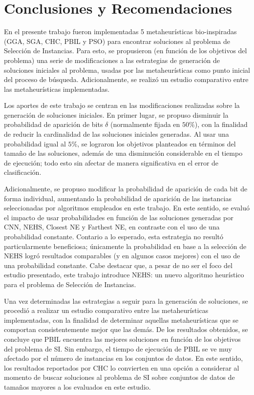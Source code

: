 \chapter*{Conclusiones y Recomendaciones}
\label{conclusiones}

En el presente trabajo fueron implementadas 5 metaheurísticas bio-inspiradas (GGA, SGA, CHC, PBIL y PSO) para encontrar soluciones al problema de Selección de Instancias. Para esto, se propusieron (en función de los objetivos del problema) una serie de modificaciones a las estrategias de generación de soluciones iniciales al problema, usadas por las metaheurísticas como punto inicial del proceso de búsqueda. Adicionalmente, se realizó un estudio comparativo entre las metaheurísticas implementadas.%

Los aportes de este trabajo se centran en las modificaciones realizadas sobre la generación de soluciones iniciales. En primer lugar, se propuso disminuir la probabilidad de aparición de bits $\delta$ (normalmente fijada en $50\%$), con la finalidad de reducir la cardinalidad de las soluciones iniciales generadas. Al usar una probabilidad igual al $5\%$, se lograron los objetivos planteados en términos del tamaño de las soluciones, además de una disminución considerable en el tiempo de ejecución; todo esto sin afectar de manera significativa en el error de clasificación.

Adicionalmente, se propuso modificar la probabilidad de aparición de cada bit de forma individual, aumentando la probabilidad de aparición de las instancias seleccionadas por algoritmos empleados en este trabajo. En este sentido, se evaluó el impacto de usar probabilidades en función de las soluciones generadas por CNN, NEHS, Closest NE y Farthest NE, en contraste con el uso de una probabilidad constante. Contario a lo esperado, esta estrategia no resultó particularmente beneficiosa; únicamente la probabilidad en base a la selección de NEHS logró resultados comparables (y en algunos casos mejores) con el uso de una probabilidad constante. Cabe destacar que, a pesar de no ser el foco del estudio presentado, este trabajo introduce NEHS: un nuevo algoritmo heurístico para el problema de Selección de Instancias.

Una vez determinadas las estrategias a seguir para la generación de soluciones, se procedió a realizar un estudio comparativo entre las metaheurísticas implementadas, con la finalidad de determinar aquellas metaheurísticas que se comportan consistentemente mejor que las demás. De los resultados obtenidos, se concluye que PBIL encuentra las mejores soluciones en función de los objetivos del problema de SI. Sin embargo, el tiempo de ejecución de PBIL se ve muy afectado por el número de instancias en los conjuntos de datos. En este sentido, los resultados reportados por CHC lo convierten en una opción a considerar al momento de buscar soluciones al problema de SI sobre conjuntos de datos de tamaños mayores a los evaluados en este estudio.

